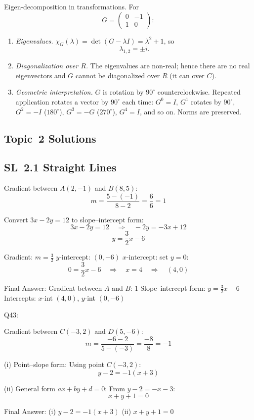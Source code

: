 \documentclass[11pt]{article}
\def\textbf#1{#1}%
\def\mathbb#1{#1}%
\newcommand{\tocsubsection}[1]{\subsection{#1}}
\begin{document}

\begin{solution}
\textbf{Eigen-decomposition in transformations.} For
\[
G=\begin{pmatrix}0&-1\\[2pt]1&0\end{pmatrix}:
\]
\begin{enumerate}
\item \emph{Eigenvalues.} $\chi_G(\lambda)=\det(G-\lambda I)=\lambda^2+1$, so
\[
\lambda_{1,2}=\pm i.
\]

\item \emph{Diagonalization over $\mathbb{R}$.} The eigenvalues are non-real; hence
there are no real eigenvectors and $G$ cannot be diagonalized over $\mathbb{R}$ (it can over $\mathbb{C}$).

\item \emph{Geometric interpretation.} $G$ is rotation by $90^\circ$ counterclockwise.
Repeated application rotates a vector by $90^\circ$ each time: $G^0=I$, $G^1$ rotates by $90^\circ$,
$G^2=-I$ ($180^\circ$), $G^3=-G$ ($270^\circ$), $G^4=I$, and so on. Norms are preserved.
\end{enumerate}
\end{solution}





\tocsubsection{Topic 2 Solutions}
\tocsubsection{SL 2.1\; Straight Lines}

\begin{solution}
\textbf{Gradient between $A(2,-1)$ and $B(8,5)$:}  
\[
m = \frac{5 - (-1)}{8 - 2} = \frac{6}{6} = 1
\]

\textbf{Convert $3x - 2y = 12$ to slope–intercept form:}  
\[
3x - 2y = 12 \quad\Rightarrow\quad -2y = -3x + 12
\]
\[
y = \frac{3}{2}x - 6
\]

\textbf{Gradient:} $m = \frac{3}{2}$  
\textbf{$y$-intercept:} $(0,-6)$  
\textbf{$x$-intercept:} set $y=0$:  
\[
0 = \frac{3}{2}x - 6 \quad\Rightarrow\quad x = 4 \quad\Rightarrow\quad (4,0)
\]

\textbf{Final Answer:}  
Gradient between $A$ and $B$: $1$  
Slope–intercept form: $y = \frac{3}{2}x - 6$  
Intercepts: $x$-int $(4,0)$, $y$-int $(0,-6)$
\end{solution}

\begin{solution}
\textbf{Q43:}  

\textbf{Gradient between $C(-3,2)$ and $D(5,-6)$:}  
\[
m = \frac{-6 - 2}{5 - (-3)} = \frac{-8}{8} = -1
\]

\textbf{(i) Point–slope form:}  
Using point $C(-3,2)$:
\[
y - 2 = -1(x + 3)
\]

\textbf{(ii) General form $ax + by + d = 0$:}  
From $y - 2 = -x - 3$:
\[
x + y + 1 = 0
\]

\textbf{Final Answer:}  
(i) $y - 2 = -1(x + 3)$  
(ii) $x + y + 1 = 0$
\end{solution}
\end{document}

